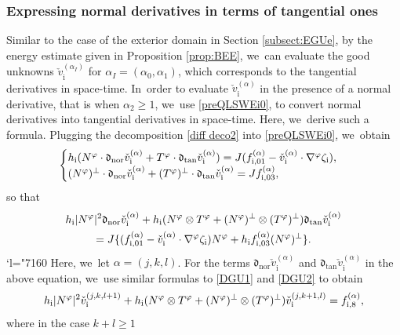 \documentclass[10pt]{amsart}
\newcommand{\Changel}{\mathcode`l="7160}
\newcommand{\dtan}{{\mathfrak d}_\mathrm{tan}}
\newcommand{\dnor}{{\mathfrak d}_\mathrm{nor}}
\theoremstyle{definition}
\begin{document}
\subsubsection{Expressing normal derivatives in terms of tangential ones}
Similar to the case of the exterior domain in Section \ref{subsect:EGUe}, by the energy estimate given in Proposition \ref{prop:BEE}, we~can evaluate the good unknowns $\check{v}_\mathrm{i}^{(\alpha_I)}$ for $\alpha_I=(\alpha_0,\alpha_1)$,
which corresponds to the tangential derivatives in space-time. In~order to evaluate $\check{v}_\mathrm{i}^{(\alpha)}$ in the presence of a normal derivative, that is when $\alpha_2\geq 1$, we~use \eqref{preQLSWEi0},
to convert normal derivatives into tangential derivatives in space-time.
Here, we~derive such a formula.
Plugging the decomposition \eqref{diff deco2} into \eqref{preQLSWEi0}, we~obtain
\[
\begin{cases}
h_\mathrm{i}(N^\varphi\cdot\dnor\check{v}_\mathrm{i}^{(\alpha)} + T^\varphi\cdot\dtan\check{v}_\mathrm{i}^{(\alpha)})
= J(f_{{\rm i}, 01}^{(\alpha)} - \check{v}_\mathrm{i}^{(\alpha)}\cdot\nabla^\varphi\zeta_\mathrm{i}), \\
(N^\varphi)^\perp\cdot\dnor\check{v}_\mathrm{i}^{(\alpha)} + (T^\varphi)^\perp\cdot\dtan\check{v}_\mathrm{i}^{(\alpha)} = Jf_{{\rm i},03}^{(\alpha)},
\end{cases}
\]
so that
\begin{multline*}
h_\mathrm{i}|N^\varphi|^2\dnor\check{v}_\mathrm{i}^{(\alpha)}
+ h_\mathrm{i}(N^\varphi\otimes T^\varphi + (N^\varphi)^\perp\otimes(T^\varphi)^\perp)\dtan\check{v}_\mathrm{i}^{(\alpha)} \\
= J\{ (f_{{\rm i}, 01}^{(\alpha)} - \check{v}_\mathrm{i}^{(\alpha)}\cdot\nabla^\varphi\zeta_\mathrm{i})N^\varphi
+ h_\mathrm{i }f_{{\rm i},03}^{(\alpha)}(N^\varphi)^\perp \}.
\end{multline*}%
\Changel%
Here, we~let $\alpha=(j,k,l)$.
For the terms $\dnor\check{v}_\mathrm{i}^{(\alpha)}$ and $\dtan\check{v}_\mathrm{i}^{(\alpha)}$ in the above equation, we~use similar formulas to \eqref{DGU1} and \eqref{DGU2} to obtain
\begin{equation}\label{QLSWEi2}
h_\mathrm{i}|N^\varphi|^2\check{v}_\mathrm{i}^{(j,k,l+1)}
+ h_\mathrm{i}(N^\varphi\otimes T^\varphi + (N^\varphi)^\perp\otimes(T^\varphi)^\perp)\check{v}_\mathrm{i}^{(j,k+1,l)} = f_{{\rm i},8}^{(\alpha)},
\end{equation}
where in the case $k+l\geq1$
\end{document}
